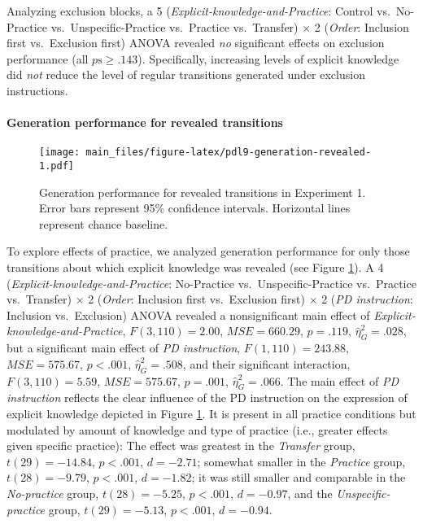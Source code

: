 \documentclass[floatsintext,doc]{apa6}
\theoremstyle{definition}
\theoremstyle{definition}
\theoremstyle{definition}
\theoremstyle{remark}
\begin{document}
Analyzing exclusion blocks, a 5 (\emph{Explicit-knowledge-and-Practice}:
Control vs.~No-Practice vs.~Unspecific-Practice vs.~Practice
vs.~Transfer) \(\times\) 2 (\emph{Order}: Inclusion first vs.~Exclusion
first) ANOVA revealed \emph{no} significant effects on exclusion
performance (all \(p\mathrm{s} \geq .143\)). Specifically, increasing
levels of explicit knowledge did \emph{not} reduce the level of regular
transitions generated under exclusion instructions.

\paragraph{Generation performance for revealed
transitions}\label{generation-performance-for-revealed-transitions}

\begin{figure}
\centering
\texttt{[image: main\_files/figure-latex/pdl9-generation-revealed-1.pdf]}
\caption{\label{fig:pdl9-generation-revealed}Generation performance for
revealed transitions in Experiment 1. Error bars represent 95\%
confidence intervals. Horizontal lines represent chance baseline.}
\end{figure}

To explore effects of practice, we analyzed generation performance for
only those transitions about which explicit knowledge was revealed (see
Figure \ref{fig:pdl9-generation-revealed}). A 4
(\emph{Explicit-knowledge-and-Practice}: No-Practice
vs.~Unspecific-Practice vs.~Practice vs.~Transfer) \(\times\) 2
(\emph{Order}: Inclusion first vs.~Exclusion first) \(\times\) 2
(\emph{PD instruction}: Inclusion vs.~Exclusion) ANOVA revealed a
nonsignificant main effect of \emph{Explicit-knowledge-and-Practice},
\(F(3, 110) = 2.00\), \(\mathit{MSE} = 660.29\), \(p = .119\),
\(\hat{\eta}^2_G = .028\), but a significant main effect of \emph{PD
instruction}, \(F(1, 110) = 243.88\), \(\mathit{MSE} = 575.67\),
\(p < .001\), \(\hat{\eta}^2_G = .508\), and their significant
interaction, \(F(3, 110) = 5.59\), \(\mathit{MSE} = 575.67\),
\(p = .001\), \(\hat{\eta}^2_G = .066\). The main effect of \emph{PD
instruction} reflects the clear influence of the PD instruction on the
expression of explicit knowledge depicted in Figure
\ref{fig:pdl9-generation-revealed}. It is present in all practice
conditions but modulated by amount of knowledge and type of practice
(i.e., greater effects given specific practice): The effect was greatest
in the \emph{Transfer} group, \(t(29) = -14.84\), \(p < .001\),
\(d = -2.71\); somewhat smaller in the \emph{Practice} group,
\(t(28) = -9.79\), \(p < .001\), \(d = -1.82\); it was still smaller and
comparable in the \emph{No-practice} group, \(t(28) = -5.25\),
\(p < .001\), \(d = -0.97\), and the \emph{Unspecific-practice} group,
\(t(29) = -5.13\), \(p < .001\), \(d = -0.94\).
\end{document}
